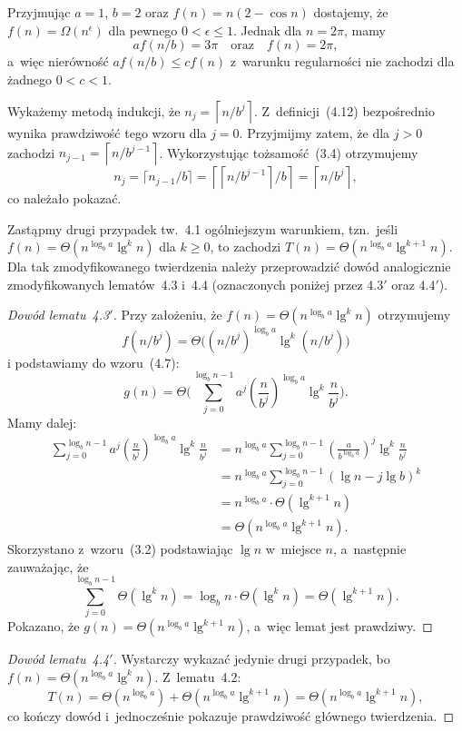 \exercise %
Przyjmując $a=1$, $b=2$ oraz $f(n)=n(2-\cos n)$ dostajemy, że $f(n)=\Omega(n^\epsilon)$ dla pewnego $0<\epsilon\le1$. Jednak dla $n=2\pi$, mamy
\[
	af(n/b) = 3\pi \quad\text{oraz}\quad f(n) = 2\pi,
\]
a~więc nierówność $af(n/b)\le cf(n)$ z~warunku regularności nie zachodzi dla żadnego $0<c<1$.


\exercise %
Wykażemy metodą indukcji, że $n_j=\left\lceil n/b^j\right\rceil$. Z~definicji~(4.12) bezpośrednio wynika prawdziwość tego wzoru dla $j=0$. Przyjmijmy zatem, że dla $j>0$ zachodzi $n_{j-1}=\left\lceil n/b^{j-1}\right\rceil$. Wykorzystując tożsamość~(3.4) otrzymujemy
\[
	n_j = \lceil n_{j-1}/b\rceil = \left\lceil\left\lceil n/b^{j-1}\right\rceil\!/b\right\rceil = \left\lceil n/b^j\right\rceil,
\]
co należało pokazać.

\exercise %
Zastąpmy drugi przypadek tw.~4.1 ogólniejszym warunkiem, tzn.\ jeśli $f(n)=\Theta(n^{\log_ba}\lg^kn)$ dla $k\ge0$, to zachodzi $T(n)=\Theta(n^{\log_ba}\lg^{k+1}n)$. Dla tak zmodyfikowanego twierdzenia należy przeprowadzić dowód analogicznie zmodyfikowanych lematów~4.3 i~4.4 (oznaczonych poniżej przez 4.3$'$ oraz 4.4$'$).

\begin{proof}[Dowód lematu~4.3\/$'$]
	Przy założeniu, że $f(n)=\Theta(n^{\log_ba}\lg^kn)$ otrzymujemy
	\[
		f(n/b^j)=\Theta\bigl((n/b^j)^{\log_ba}\lg^k(n/b^j)\bigr)
	\]
	i podstawiamy do wzoru~(4.7):
	\[
		g(n) = \Theta\biggl(\sum_{j=0}^{\log_bn-1}a^j\left(\frac{n}{b^j}\right)^{\log_ba}\lg^k\frac{n}{b^j}\biggr).
	\]
	Mamy dalej:
	\begin{align*}
		\sum_{j=0}^{\log_bn-1}a^j\left(\frac{n}{b^j}\right)^{\log_ba}\lg^k\frac{n}{b^j} &= n^{\log_ba}\sum_{j=0}^{\log_bn-1}\left(\frac{a}{b^{\log_ba}}\right)^j\lg^k\frac{n}{b^j} \\
		&= n^{\log_ba}\sum_{j=0}^{\log_bn-1}(\lg n-j\lg b)^k \\
		&= n^{\log_ba}\cdot\Theta(\lg^{k+1}n) \\
		&= \Theta(n^{\log_ba}\lg^{k+1}n).
	\end{align*}
	Skorzystano z~wzoru~(3.2) podstawiając $\lg n$ w~miejsce $n$, a~następnie zauważając, że
	\[
		\sum_{j=0}^{\log_bn-1}\Theta(\lg^kn) = \log_bn\cdot\Theta(\lg^kn) = \Theta(\lg^{k+1}n).
	\]
	Pokazano, że $g(n)=\Theta(n^{\log_ba}\lg^{k+1}n)$, a~więc lemat jest prawdziwy.
\end{proof}

\begin{proof}[Dowód lematu~4.4\/$'$]
	Wystarczy wykazać jedynie drugi przypadek, bo $f(n)=\Theta(n^{\log_ba}\lg^kn)$. Z~lematu~4.2:
	\[
		T(n) = \Theta(n^{\log_ba})+\Theta(n^{\log_ba}\lg^{k+1}n) = \Theta(n^{\log_ba}\lg^{k+1}n),
	\]
	co kończy dowód i~jednocześnie pokazuje prawdziwość głównego twierdzenia.
\end{proof}

